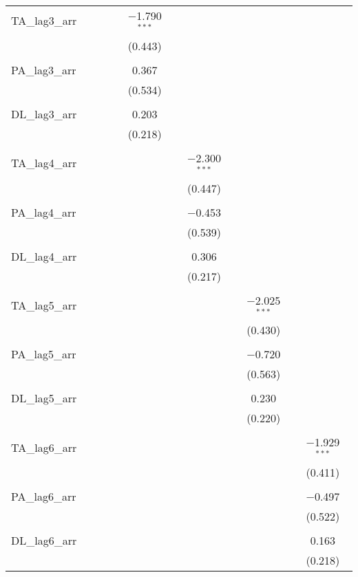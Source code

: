 \begin{table}[!htbp]
\begin{tabular}{@{\extracolsep{5pt}}lccccccc}
 TA\_lag3\_arr &  &  &  & $-$1.790$^{***}$ &  &  &  \\ 
  &  &  &  & (0.443) &  &  &  \\ 
  & & & & & & & \\ 
 PA\_lag3\_arr &  &  &  & 0.367 &  &  &  \\ 
  &  &  &  & (0.534) &  &  &  \\ 
  & & & & & & & \\ 
 DL\_lag3\_arr &  &  &  & 0.203 &  &  &  \\ 
  &  &  &  & (0.218) &  &  &  \\ 
  & & & & & & & \\ 
 TA\_lag4\_arr &  &  &  &  & $-$2.300$^{***}$ &  &  \\ 
  &  &  &  &  & (0.447) &  &  \\ 
  & & & & & & & \\ 
 PA\_lag4\_arr &  &  &  &  & $-$0.453 &  &  \\ 
  &  &  &  &  & (0.539) &  &  \\ 
  & & & & & & & \\ 
 DL\_lag4\_arr &  &  &  &  & 0.306 &  &  \\ 
  &  &  &  &  & (0.217) &  &  \\ 
  & & & & & & & \\ 
 TA\_lag5\_arr &  &  &  &  &  & $-$2.025$^{***}$ &  \\ 
  &  &  &  &  &  & (0.430) &  \\ 
  & & & & & & & \\ 
 PA\_lag5\_arr &  &  &  &  &  & $-$0.720 &  \\ 
  &  &  &  &  &  & (0.563) &  \\ 
  & & & & & & & \\ 
 DL\_lag5\_arr &  &  &  &  &  & 0.230 &  \\ 
  &  &  &  &  &  & (0.220) &  \\ 
  & & & & & & & \\ 
 TA\_lag6\_arr &  &  &  &  &  &  & $-$1.929$^{***}$ \\ 
  &  &  &  &  &  &  & (0.411) \\ 
  & & & & & & & \\ 
 PA\_lag6\_arr &  &  &  &  &  &  & $-$0.497 \\ 
  &  &  &  &  &  &  & (0.522) \\ 
  & & & & & & & \\ 
 DL\_lag6\_arr &  &  &  &  &  &  & 0.163 \\ 
  &  &  &  &  &  &  & (0.218) \\ 

\end{tabular}
\end{table}
